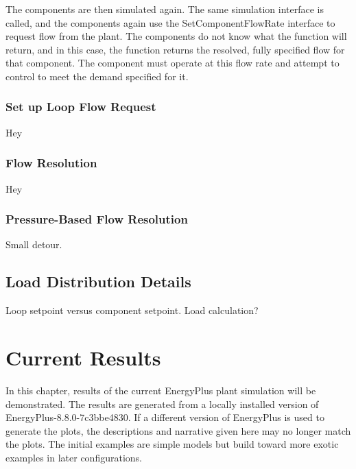 \documentclass{report}
\begin{document}
    The components are then simulated again.
    The same simulation interface is called, and the components again use the SetComponentFlowRate interface to request flow from the plant.
    The components do not know what the function will return, and in this case, the function returns the resolved, fully specified flow for that component.
    The component must operate at this flow rate and attempt to control to meet the demand specified for it.

        \subsection{Set up Loop Flow Request}\label{subsec:modeling-flow-request}
            Hey

        \subsection{Flow Resolution}\label{subsec:modeling-flow-resolver}
            Hey

        \subsection{Pressure-Based Flow Resolution}\label{subsec:modeling-flow-pressure}
            Small detour.

    \section{Load Distribution Details}\label{sec:modeling-dispatch}

    Loop setpoint versus component setpoint.
    Load calculation?


    \chapter{Current Results}\label{ch:current}

    In this chapter, results of the current EnergyPlus plant simulation will be demonstrated.
    The results are generated from a locally installed version of EnergyPlus-8.8.0-7c3bbe4830.
    If a different version of EnergyPlus is used to generate the plots, the descriptions and narrative given here may no longer match the plots.
    The initial examples are simple models but build toward more exotic examples in later configurations.
\end{document}
